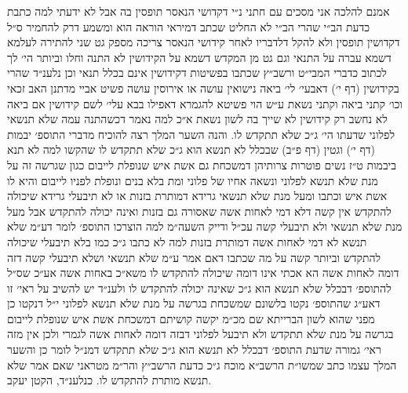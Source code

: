 \documentclass[12pt, openany]{book}
\begin{document}
\begin{multicols}{2}
אמנם להלכה אני מסכים עם חתני נ״י דקדושי הנאסר תופסין בה אבל לא ידעתי למה כתבת כדעת הב״י שהרי הב״י לא החליט שכתב דמיראי הוראה הוא ומשמע דרק להחמיר ס״ל דקדושין תופסין ולא להקל דלדבריו לאחר קידושי הנאסר צריכה מספק גט שני להתירה לעלמא דשמא עברה על התנאי וגם גט מן המקדש דשמא על הקידושין לא התנה וחלו וביותר הי׳ לך לכתוב כדברי המבי״ט ורשב״ץ שכתבו בפשיטות דקידושין אינם בכלל תנאי וכן נלענ״ד שהרי בקידושין (דף י׳) דאבעי׳ לי׳ ביאה נישואין עושה או אירוסין עושה פשיט אביי מדתנן האב זכאי וכו׳ קתני ביאה וקתני נשאת ע״ש הוי פשיטא להגמרא דאפילו בבא עלי׳ לשם קידושין אם ביאה לא נחשב רק קידושין לא שייך בה לשון נשאת א״כ למה נאמר דכשהתנה עמה שלא תנשאי לפלוני שדעתו הי׳ ג״כ שלא תתקדש לו. והנה השער המלך רצה להוכיח מדברי התוספ׳ יבמות (דף י׳) וגטין (דף פ״ב) שבכלל לא תנשא הוא ג״כ שלא תתקדש לו שהקשו למה לא תנא ביבמות ט״ז נשים פוטרות צרותיהן דמשכחת גם אשת איש שנופלת לייבום כגון שגרשה זה על מנת שלא תנשא לפלוני ונשאה אחיו של פלוני ומת בלא בנים ונופלת לפניו לייבום והיא לו אשת איש וכתבו ומעל מנת שלא תנשאי גרידא דמותרת בזנות או לא תיבעלי גרידא שיכולה להתקדש אין קשה דלא דמי לאחות אשה שאסורה גם בזנות ואינה יכולה להתקדש אבל מעל מנת שלא תנשאי ולא תיבעלי קשה עכ״ל ודייק השעה״מ למה הוצרכו התוספ׳ לומר דע״מ שלא תנשא לא דמי לאחות אשה דמותרת בזנות למה לא כתבו ג״כ כמו בלא תיבעלי שיכולה להתקדש וביותר קשה על מה שכתבו דאם אמר ע״מ שלא תנשאי ושלא תיבעלי קשה דזה דומה לאחות אשה הא אכתי אינו דומה שיכולה להתקדש לו משא״כ באחות אשה אע״כ שס״ל להתוספ׳ דבכלל שלא תנשא הוא ג״כ שאינה יכולה להתקדש לו ולענ״ד יש להשיב על ראי׳ זו דאע״ג שהתוספ׳ נקטו בלשונם שמשכחת בגרשה על מנת שלא תנשא לפלוני י״ל דנקטו כן מפני שהוא לשון הברייתא שם מכ״מ יקשה קושיתם דמשכחת אשת איש שנופלת לייבום בגרשה על מנת שלא תתקדש ולא תיבעל לפלוני דבזה דומה לאחות אשה לגמרי ולכן אין מזה ראי׳ גמורה שדעת התוספ׳ דבכלל לא תנשא הוא ג״כ שלא תתקדש דמנ״ל לומר כן והשער המלך עצמו כתב שמשו״ת הרשב״א מוכח ג״כ כדעת הרשב״ץ והר״מ מטראני שאם אמר שלא תנשא מותרת להתקדש לו. כנלענ״ד, הקטן יעקב.\\\vspace{0pt}

\end{multicols}\newpage
\end{document}
